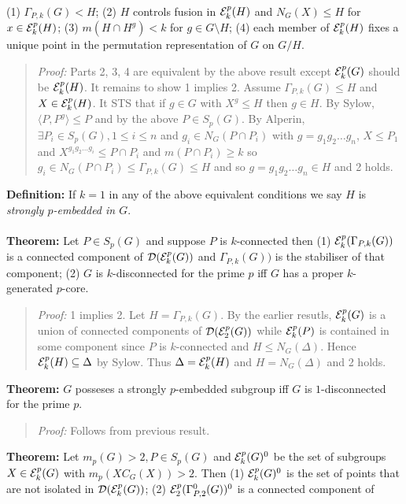 (1) $\Gamma_{P,k}(G)<H$;
(2) $H$ controls fusion in ${\cal E}_k^p(H)$ and $N_G(X) \le H$ for
$x \in {\cal E}_k^p(H)$;
(3) $m(H \cap H^g)<k$ for $g \in G \setminus H$;
(4) each member of
${\cal E}_k^p(H)$ fixes a unique point in the permutation representation of $G$ on $G/H$.
\begin{quote}
\emph{Proof:}  Parts 2, 3, 4 are equivalent by the above result except
${\cal E}^p_k(G)$ should be
${\cal E}^p_k(H)$.  It remains to show 1 implies 2.
Assume
$\Gamma_{P, k}(G) \le H$ and $X \in {\cal E}^p_k(H)$.  It STS
that if $g \in G$ with $X^g \le H$ then $g \in H$.  By Sylow,
$\langle P, P^g \rangle \le P$ and by the above
$P \in S_p(G)$.  By Alperin, $\exists P_i \in S_p(G), 1 \le i \le n$ and
$g_i \in N_G(P \cap P_i )$ with $g= g_1 g_2 \ldots g_n$, $X \le P_1$
and $X^{g_1 g_2 \ldots g_i} \le P \cap P_i$ and $m(P \cap P_i) \ge k$
so $g_i \in N_G(P \cap P_i) \le
\Gamma_{P, k}(G) \le H $ and so
$g= g_1 g_2 \ldots g_n \in H$ and 2 holds.
\end{quote}
{\bf Definition:}  If $k=1$ in any of the above equivalent conditions we say $H$ is
\emph{strongly $p$-embedded in $G$}.
\\
\\
{\bf Theorem:} Let $P \in S_p(G)$ and suppose $P$ is $k$-connected then
(1) ${\cal E}_k^p(\Gamma_{P,k}(G))$ is a connected component of
${\cal D}({\cal E}_k^p(G))$ and
$\Gamma_{P,k}(G))$ is the stabiliser of that component;
(2) $G$ is $k$-disconnected for the prime $p$ iff $G$ has a proper $k$-generated $p$-core.
\begin{quote}
\emph{Proof:}  1 implies 2.  Let $H= \Gamma_{P, k}(G)$.  By the earlier resutls,
${\cal E}^p_k(G)$
is a union of connected components of
${\cal D}({\cal E}^p_2(G))$
while
${\cal E}^p_k(P)$ is contained in some component since
$P$ is $k$-connected and $H \le N_G( \Delta )$.  Hence
${\cal E}^p_k(H) \subseteq \Delta$ by Sylow. Thus
$\Delta = {\cal E}^p_k(H)$ and $H= N_G( \Delta )$ and 2 holds.
\end{quote}
{\bf Theorem:} $G$ posseses a strongly $p$-embedded subgroup iff $G$ is $1$-disconnected for the prime $p$.
\begin{quote}
\emph{Proof:}  Follows from previous result.
\end{quote}
{\bf Theorem:} Let $m_p(G) > 2, P \in S_p(G)$ and
${\cal E}_k^p(G)^0$ be the set of subgroups $X \in {\cal E}_k^p(G)$ with $m_p(XC_G(X)) > 2$.  Then
(1) ${\cal E}_k^p(G)^0$ is the set of points that are not isolated in
${\cal D}({\cal E}_k^p(G))$;
(2) ${\cal E}_2^p(\Gamma_{P,2}^0(G))^0$ is a connected component of
